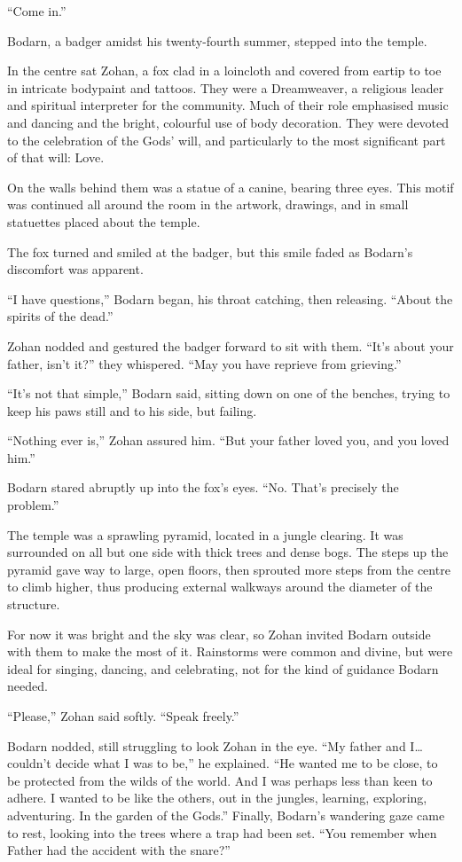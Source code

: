 ``Come in.''

Bodarn, a badger amidst his twenty-fourth summer, stepped into the temple.

In the centre sat Zohan, a fox clad in a loincloth and covered from eartip to toe in intricate bodypaint and tattoos. They were a Dreamweaver, a religious leader and spiritual interpreter for the community. Much of their role emphasised music and dancing and the bright, colourful use of body decoration. They were devoted to the celebration of the Gods' will, and particularly to the most significant part of that will: Love.

On the walls behind them was a statue of a canine, bearing three eyes. This motif was continued all around the room in the artwork, drawings, and in small statuettes placed about the temple.

The fox turned and smiled at the badger, but this smile faded as Bodarn's discomfort was apparent.

``I have questions,'' Bodarn began, his throat catching, then releasing. ``About the spirits of the dead.''

Zohan nodded and gestured the badger forward to sit with them. ``It's about your father, isn't it?'' they whispered. ``May you have reprieve from grieving.''

``It's not that simple,'' Bodarn said, sitting down on one of the benches, trying to keep his paws still and to his side, but failing.

``Nothing ever is,'' Zohan assured him. ``But your father loved you, and you loved him.''

Bodarn stared abruptly up into the fox's eyes. ``No. That's precisely the problem.''

\secdiv

\noindent The temple was a sprawling pyramid, located in a jungle clearing. It was surrounded on all but one side with thick trees and dense bogs. The steps up the pyramid gave way to large, open floors, then sprouted more steps from the centre to climb higher, thus producing external walkways around the diameter of the structure.

For now it was bright and the sky was clear, so Zohan invited Bodarn outside with them to make the most of it. Rainstorms were common and divine, but were ideal for singing, dancing, and celebrating, not for the kind of guidance Bodarn needed.

``Please,'' Zohan said softly. ``Speak freely.''

Bodarn nodded, still struggling to look Zohan in the eye. ``My father and I\ldots{} couldn't decide what I was to be,'' he explained. ``He wanted me to be close, to be protected from the wilds of the world. And I was perhaps less than keen to adhere. I wanted to be like the others, out in the jungles, learning, exploring, adventuring. In the garden of the Gods.'' Finally, Bodarn's wandering gaze came to rest, looking into the trees where a trap had been set. ``You remember when Father had the accident with the snare?''

